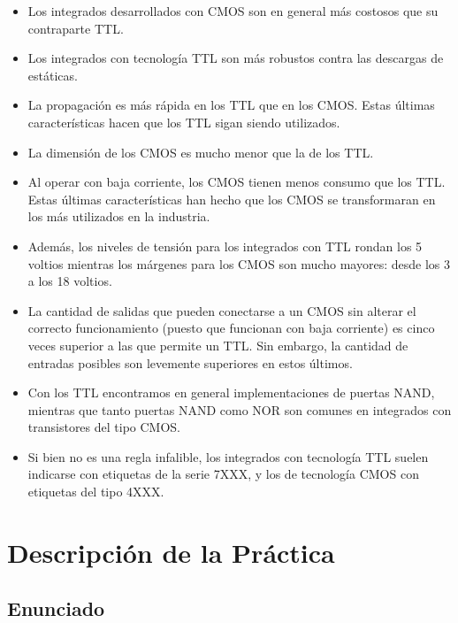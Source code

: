 \documentclass[a4paper]{article}
\begin{document}
\begin{itemize}
    \item {
        Los integrados desarrollados con CMOS son en general más 
        costosos que su contraparte TTL.
    }
    \item {
        Los integrados con tecnología TTL son más robustos contra
        las descargas de estáticas.
    }
    \item {
        La propagación es más rápida en los TTL que en los CMOS. 
        Estas últimas características hacen que los TTL sigan siendo
        utilizados.
    }    
    \item {
        La dimensión de los CMOS es mucho menor que la de los TTL.
    }
    \item {
        Al operar con baja corriente, los CMOS tienen menos consumo 
        que los TTL. Estas últimas características han hecho que los 
        CMOS se transformaran en los más utilizados en la industria.
    }
    \item {
        Además, los niveles de tensión para los integrados con TTL 
        rondan los 5 voltios mientras los márgenes para los CMOS son
        mucho mayores: desde los 3 a los 18 voltios.
    }
    \item {
        La cantidad de salidas que pueden conectarse a un CMOS sin 
        alterar el correcto funcionamiento (puesto que funcionan con
        baja corriente) es cinco veces superior a las que permite un 
        TTL. Sin embargo, la cantidad de entradas posibles son 
        levemente superiores en estos últimos.
    }
    \item {
        Con los TTL encontramos en general implementaciones de puertas
        NAND, mientras que tanto puertas NAND como NOR son comunes en
        integrados con transistores del tipo CMOS.
    }
    \item {
        Si bien no es una regla infalible, los integrados con 
        tecnología TTL suelen indicarse con etiquetas de la serie 
        7XXX, y los de tecnología CMOS con etiquetas del tipo 4XXX.
    }
\end{itemize}

\section{Descripción de la Práctica}

\subsection{Enunciado}
\end{document}
